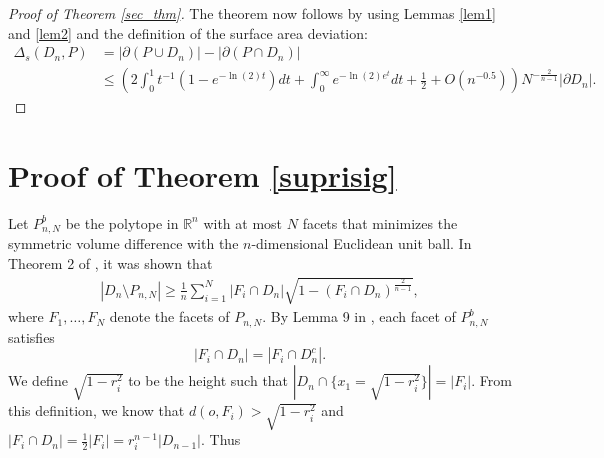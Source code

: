 \documentclass[10pt, twoside, leqno]{article}
\theoremstyle{definition}
\numberwithin{equation}{section}
\newcommand{\be}{\begin{equation}}
\newcommand{\ee}{\end{equation}}
\newcommand{\R}{\mathbb{R}}
\newcommand{\NN}{N^{-\frac 2{n-1} }}
\begin{document}
\begin{proof}[Proof of Theorem \ref{sec_thm}]
The theorem now follows by using Lemmas \ref{lem1} and \ref{lem2} and the definition of the surface area deviation:
\be
\begin{aligned}
\Delta_s\left(D_n,P\right)&=|\partial\left(P\cup D_n\right)|-|\partial\left(P\cap D_n\right)|\\&\leq \left(2\int_{0}^{1} t^{-1}(1-e^{-\ln(2)t})dt + \int_{0}^{\infty}e^{-\ln(2)e^{t}}dt + \frac{1}{2} + O(n^{-0.5})\right)\NN|\partial D_n|.
\end{aligned}
\ee
\end{proof}
\section{Proof of Theorem \ref{suprisig}}
Let $ P^b_{n,N} $ be the polytope in $ \R^n $ with at most $ N $ facets that minimizes the symmetric volume difference with the $n$-dimensional Euclidean unit ball. In Theorem 2 of \cite{Lud06}, it was shown that
\begin{align*}
|D_n\setminus P_{n,N}| \geq \frac 1{n}\sum_{i=1}^{N}|F_i\cap D_n|\sqrt{1-(F_i\cap D_n)^{\frac{2}{n-1}}},
\end{align*}
where $F_1,\ldots,F_N$ denote the facets of $ P_{n,N}.$ By Lemma 9 in \cite{Lud06}, each facet of $ P^b_{n,N} $ satisfies
\[
|F_i \cap D_n| = |F_i \cap D^c_n|.
\]
We define $ \sqrt{1-r_i^2}$ to be the height such that $|D_n \cap \{x_1=\sqrt{1-r_i^2}\}| = |F_i|.$ From this definition, we know that $ d(o,F_i) > \sqrt{1-r_i^2} $ and $ |F_i \cap D_n| = \frac{1}{2}|F_i| = r_i^{n-1}|D_{n-1}|.$  Thus
\end{document}
